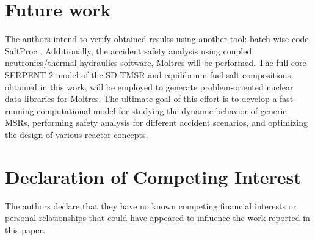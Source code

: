 \section{Future work}
The authors intend to verify obtained results using another tool: batch-wise 
code SaltProc \cite{rykhlevskii_arfc/saltproc_2018,rykhlevskii_milestone_2019}.
Additionally, the accident safety analysis using coupled 
neutronics/thermal-hydraulics software, Moltres 
\cite{lindsay_introduction_2018} will be performed. The full-core SERPENT-2 
model of the \gls{SD-TMSR} and equilibrium fuel salt compositions, obtained in 
this work, will be employed to generate problem-oriented nuclear data 
libraries for Moltres. The ultimate goal of this effort is to develop a 
fast-running computational model for studying the dynamic behavior of generic 
\glspl{MSR}, performing safety analysis for different accident scenarios, and 
optimizing the design of various reactor concepts.

\section{Declaration of Competing Interest}

The authors declare that they have no known competing financial interests or personal relationships that could have appeared to influence the work reported in this paper.
